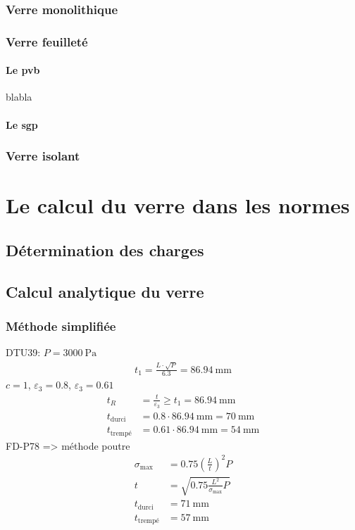 \documentclass[11pt,titlepage]{article}
\begin{document}
\subsubsection{Verre monolithique}
\subsubsection{Verre feuilleté}
\paragraph{Le \acrshort{pvb}}
blabla
\paragraph{Le \acrshort{sgp}}
\subsubsection{Verre isolant}
\newpage
\section{Le calcul du verre dans les normes}
\subsection{Détermination des charges}
\subsection{Calcul analytique du verre}
\subsubsection{Méthode simplifiée}
DTU39: $P = \qty{3000}{\pascal}$
\begin{align}
    t_1 = \frac{L \cdot \sqrt{P}}{6.3} = \qty{86.94}{\milli\meter}
\end{align}
$c=1$, $\varepsilon_3 = 0.8$, $\varepsilon_3 = 0.61$
\begin{align}
    t_R &= \frac{t}{\varepsilon_3} \geq t_1 =  \qty{86.94}{\milli\meter}\\ 
    t_{\text{durci}} &= 0.8\cdot \qty{86.94}{\milli\meter}= \qty{70}{\milli\meter}\\
    t_{\text{trempé}} &= 0.61 \cdot \qty{86.94}{\milli\meter} = \qty{54}{\milli\meter}
\end{align}
FD-P78 => méthode poutre
\begin{align}
    \sigma_{\text{max}} &= 0.75\left (\frac{L}{t}\right)^2 P \\
    t &= \sqrt{0.75\frac{L^2}{\sigma_{\text{max}}}P}\\
     t_{\text{durci}} &= \qty{71}{\milli\meter}\\
    t_{\text{trempé}} &= \qty{57}{\milli\meter}
\end{align}
\end{document}
